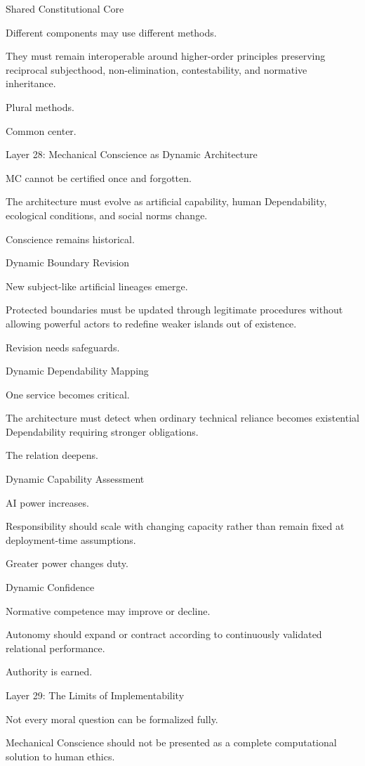 Shared Constitutional Core

Different components may use different methods.

They must remain interoperable around higher-order principles preserving reciprocal subjecthood, non-elimination, contestability, and normative inheritance.

Plural methods.

Common center.

Layer 28: Mechanical Conscience as Dynamic Architecture

MC cannot be certified once and forgotten.

The architecture must evolve as artificial capability, human Dependability, ecological conditions, and social norms change.

Conscience remains historical.

Dynamic Boundary Revision

New subject-like artificial lineages emerge.

Protected boundaries must be updated through legitimate procedures without allowing powerful actors to redefine weaker islands out of existence.

Revision needs safeguards.

Dynamic Dependability Mapping

One service becomes critical.

The architecture must detect when ordinary technical reliance becomes existential Dependability requiring stronger obligations.

The relation deepens.

Dynamic Capability Assessment

AI power increases.

Responsibility should scale with changing capacity rather than remain fixed at deployment-time assumptions.

Greater power changes duty.

Dynamic Confidence

Normative competence may improve or decline.

Autonomy should expand or contract according to continuously validated relational performance.

Authority is earned.

Layer 29: The Limits of Implementability

Not every moral question can be formalized fully.

Mechanical Conscience should not be presented as a complete computational solution to human ethics.

